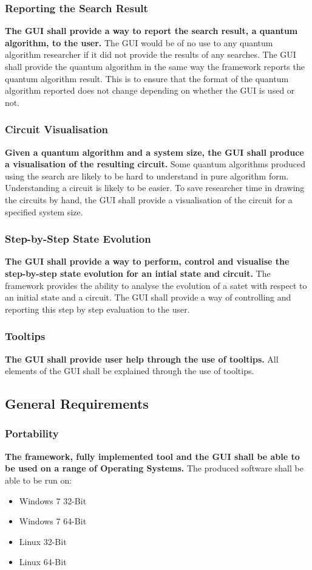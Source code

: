 \subsubsection{Reporting the Search Result}
\textbf{The GUI shall provide a way to report the search result, a quantum algorithm, to the user.}
The GUI would be of no use to any quantum algorithm researcher if it did not provide the results of any searches.
The GUI shall provide the quantum algorithm in the same way the framework reports the quantum algorithm result.
This is to ensure that the format of the quantum algorithm reported does not change depending on whether the GUI is used or not.

\subsubsection{Circuit Visualisation}
\textbf{Given a quantum algorithm and a system size, the GUI shall produce a visualisation of the resulting circuit.}
Some quantum algorithms produced using the search are likely to be hard to understand in pure algorithm form.
Understanding a circuit is likely to be easier.
To save researcher time in drawing the circuits by hand, the GUI shall provide a visualisation of the circuit for a specified system size.

\subsubsection{Step-by-Step State Evolution}
\textbf{The GUI shall provide a way to perform, control and visualise the step-by-step state evolution for an intial state and circuit.}
The framework provides the ability to analyse the evolution of a satet with respect to an initial state and a circuit.
The GUI shall provide a way of controlling and reporting this step by step evaluation to the user.

\subsubsection{Tooltips}
\textbf{The GUI shall provide user help through the use of tooltips.}
All elements of the GUI shall be explained through the use of tooltips.

\subsection{General Requirements}
\subsubsection{Portability}
\textbf{The framework, fully implemented tool and the GUI shall be able to be used on a range of Operating Systems.}
The produced software shall be able to be run on:
\begin{itemize}
 \item Windows 7 32-Bit
 \item Windows 7 64-Bit
 \item Linux 32-Bit
 \item Linux 64-Bit
\end{itemize}

